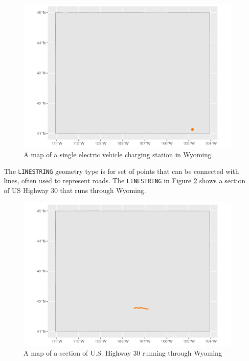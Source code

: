 \documentclass[
]{book}
\begin{document}
\begin{figure}
\includegraphics[width=1\linewidth]{maps_files/figure-latex/ev-stations-map-1} \caption{A map of a single electric vehicle charging station in Wyoming}\label{fig:ev-stations-map}
\end{figure}

The \texttt{LINESTRING} geometry type is for set of points that can be connected with lines, often used to represent roads. The \texttt{LINESTRING} in Figure \ref{fig:wy-roads-map} shows a section of US Highway 30 that runs through Wyoming.

\begin{figure}
\includegraphics[width=1\linewidth]{maps_files/figure-latex/wy-roads-map-1} \caption{A map of a section of U.S. Highway 30 running through Wyoming}\label{fig:wy-roads-map}
\end{figure}
\end{document}
